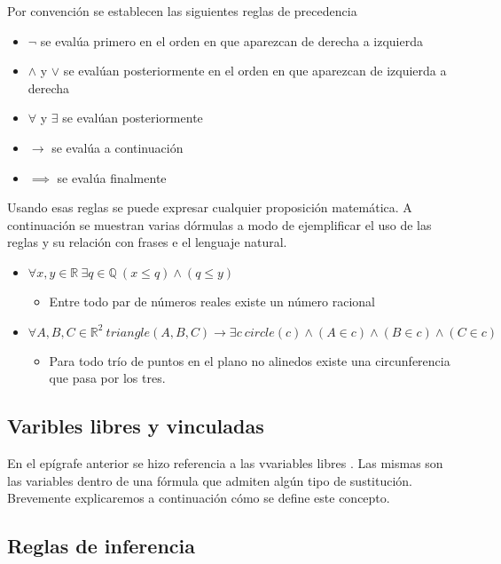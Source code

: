 Por convención se establecen las siguientes reglas de precedencia

\begin{itemize}
	\item{$\neg$ se evalúa primero en el orden en que aparezcan de derecha a izquierda}
	\item{$\land$ y $\lor$ se evalúan posteriormente en el orden en que aparezcan de izquierda a derecha}
	\item{$\forall$ y $\exists$ se evalúan posteriormente}
	\item{$\to$ se evalúa a continuación}
	\item{$\implies$ se evalúa finalmente}
\end{itemize}

Usando esas reglas se puede expresar cualquier proposición matemática. A continuación se muestran varias dórmulas a modo de ejemplificar el uso de las reglas y su relación con frases e el lenguaje natural.

\begin{itemize}
	\item{$\forall x,y \in \mathbb{R}\ \exists q \in \mathbb{Q}\ (x \leq q) \land (q \leq y)$ }
		\begin{itemize}
			\item{Entre todo par de números reales existe un número racional}
		\end{itemize}
	\item{$\forall A,B,C \in \mathbb{R}^2\ triangle(A, B, C) \to \exists c\ circle(c) \land (A \in c) \land (B \in c) \land (C \in c)$ }
		\begin{itemize}
			\item{Para todo trío de puntos en el plano no alinedos existe una circunferencia que pasa por los tres.}
		\end{itemize}
\end{itemize}

\subsection{Varibles libres y vinculadas}

En el epígrafe anterior se hizo referencia a las vvariables libres . Las mismas son las variables dentro de una fórmula que admiten algún tipo de sustitución. Brevemente explicaremos a continuación cómo se define este concepto.



\subsection{Reglas de inferencia}

